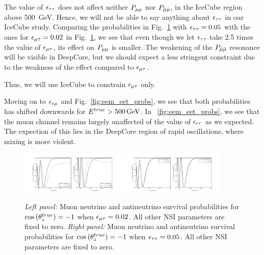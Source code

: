 \documentclass{thesis}
\begin{document}
The value of $\epsilon_{\tau\tau}$ does not affect neither $P_{\mu\mu}$ nor $P_{\bar{\mu} \bar{\mu}}$, in the IceCube region above \SI{500}{\GeV}. Hence, we will not be able
to say anything about $\epsilon_{\tau\tau}$ in our IceCube study.  Comparing the probabilities in Fig.~\ref{fig:emt_ett_probs} with $\epsilon_{\tau\tau} = 0.05$ with the ones for $\epsilon_{\mu\tau} = 0.02$ in Fig.~\ref{fig:emt_ett_probs},
we see that even though we let $\epsilon_{\tau\tau}$ take 2.5 times the value of $\epsilon_{\mu\tau}$, its effect on $P_{\mu\mu}$ is smaller. The weakening of the $P_{\bar{\mu} \bar{\mu}}$ resonance will be visible in DeepCore, but we should expect a less stringent 
constraint due to the weakness of the effect compared to $\epsilon_{\mu\tau}$. 

Thus, we will use IceCube to constrain $\epsilon_{\mu\tau}$ only.


Moving on to $\epsilon_{e\mu}$ and Fig.~\ref{fig:eem_eet_probs}, we see that both probabilities has shifted downwards for $\Etrue > \SI{500}{\GeV}$.
In ~\ref{fig:eem_eet_probs}, we see that the muon channel remains largely unaffected of the value of $\epsilon_{e\tau}$ as we expected. The expection of this lies 
in the DeepCore region of rapid oscillations, where mixing is more violent. 
\begin{figure}\label{fig:emt_ett_probs}
    \begin{center}%
        \includegraphics[width=0.45\textwidth]{figures/emt_probs.pdf}
        \includegraphics[width=0.45\textwidth]{figures/ett_probs.pdf}
        \caption{\emph{Left panel:} Muon neutrino and antineutrino survival probabilities for
        $\cos{(\theta_z^{true})} = -1$ when $\epsilon_{\mu\tau} = 0.02$. All other NSI parameters are fixed to zero.
        \emph{Right panel:} Muon neutrino and antineutrino survival probabilities for
        $\cos{(\theta_z^{true})} = -1$ when $\epsilon_{\tau\tau} = 0.05$. All other NSI parameters are fixed to zero.}
    \end{center}
\end{figure}
\end{document}
